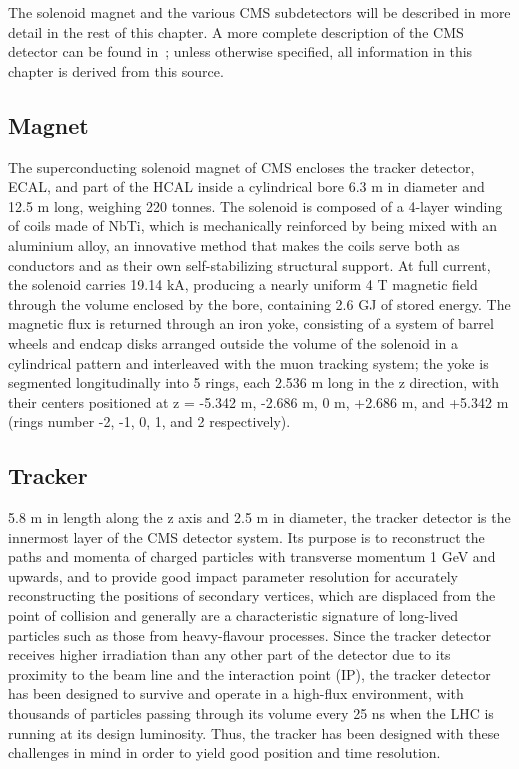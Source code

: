 The solenoid magnet and the various CMS subdetectors will be described in more detail in the rest of this chapter. A more complete description of the CMS detector can be found in~\cite{1748-0221-3-08-S08004}; unless otherwise specified, all information in this chapter is derived from this source.

\subsection{Magnet\label{sec:cms-magnet}}

The superconducting solenoid magnet of CMS encloses the tracker detector, ECAL, and part of the HCAL inside a cylindrical bore 6.3 m in diameter and 12.5 m long, weighing 220 tonnes. The solenoid is composed of a 4-layer winding of coils made of NbTi, which is mechanically reinforced by being mixed with an aluminium alloy, an innovative method that makes the coils serve both as conductors and as their own self-stabilizing structural support. At full current, the solenoid carries 19.14 kA, producing a nearly uniform 4 T magnetic field through the volume enclosed by the bore, containing 2.6 GJ of stored energy. The magnetic flux is returned through an iron yoke, consisting of a system of barrel wheels and endcap disks arranged outside the volume of the solenoid in a cylindrical pattern and interleaved with the muon tracking system; the yoke is segmented longitudinally into 5 rings, each 2.536 m long in the z direction, with their centers positioned at z = -5.342 m, -2.686 m, 0 m, +2.686 m, and +5.342 m (rings number -2, -1, 0, 1, and 2 respectively).

\subsection{Tracker\label{sec:cms-tracker}}

5.8 m in length along the z axis and 2.5 m in diameter, the tracker detector is the innermost layer of the CMS detector system. Its purpose is to reconstruct the paths and momenta of charged particles with transverse momentum 1 GeV and upwards, and to provide good impact parameter resolution for accurately reconstructing the positions of secondary vertices, which are displaced from the point of collision and generally are a characteristic signature of long-lived particles such as those from heavy-flavour processes. Since the tracker detector receives higher irradiation than any other part of the detector due to its proximity to the beam line and the interaction point (IP), the tracker detector has been designed to survive and operate in a high-flux environment, with thousands of particles passing through its volume every 25 ns when the LHC is running at its design luminosity. Thus, the tracker has been designed with these challenges in mind in order to yield good position and time resolution.

